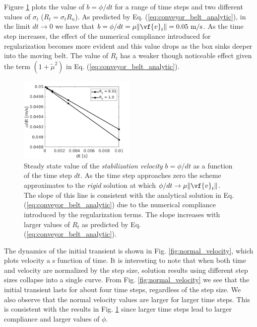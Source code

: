 Figure \ref{fig:phi_over_h_Rt_comparison} plots the value of $b=\phi/dt$ for a
range of time steps and two different values of $\sigma_t$ ($R_t=\sigma_tR_n$).
As predicted by Eq. (\ref{eq:conveyor_belt_analytic}), in the limit
$dt\rightarrow 0$ we have that
$b=\phi/dt=\mu\Vert\vf{v}_t\Vert=0.05~\text{m}/\text{s}$. As the time step
increases, the effect of the numerical compliance introduced for regularization
becomes more evident and this value drops as the box sinks deeper into the
moving belt. The value of $R_t$ has a weaker though noticeable effect given the
term $(1+\tilde\mu^2)$ in Eq. (\ref{eq:conveyor_belt_analytic}).
%
\begin{figure}[!h]
	\centering
	\includegraphics[width=0.5\textwidth]{figures/conveyor_belt/phi_over_h_Rt_comparison.png}
	\caption{\label{fig:phi_over_h_Rt_comparison} 
	Steady state value of the \textit{stabilization velocity} $b=\phi/dt$ as a
	function of the time step $dt$. As the time step approaches zero the scheme
	approximates to the \textit{rigid} solution at which
	$\phi/dt\rightarrow\mu\Vert\vf{v}_t\Vert$. The slope of this line is
	consistent with the analytical solution in Eq.
	(\ref{eq:conveyor_belt_analytic}) due to the numerical compliance introduced
	by the regularization terms. The slope increases with larger values of $R_t$
	as predicted by Eq. (\ref{eq:conveyor_belt_analytic}).}
\end{figure}

The dynamics of the initial transient is shown in Fig.
\ref{fig:normal_velocity}, which plots velocity a s function of time. It is
interesting to note that when both time and velocity are normalized by the step
size, solution results using different step sizes collapse into a single curve.
From Fig. \ref{fig:normal_velocity} we see that the initial transient lasts for
about four time steps, regardless of the step size. We also observe that the
normal velocity values are larger for larger time steps. This is consistent with
the results in Fig. \ref{fig:phi_over_h_Rt_comparison} since larger time steps
lead to larger compliance and larger values of $\phi$. 



